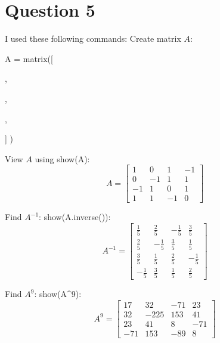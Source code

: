 \documentclass[10pt]{article}
\begin{document}
\section*{Question 5}
\noindent I used these following commands:
\noindent Create matrix $A$: \par
A = matrix([ \par
[1, 0, 1, -1], \par
[0, -1, 1, 1], \par
[-1, 1, 0, 1], \par
[1,  1, -1, 0] ] ) \par
\noindent  View $A$ using show(A):
\begin{equation*}
    A=
    \begin{bmatrix}
        1 & 0 & 1 & -1 \\
        0 & -1 & 1 & 1 \\
        -1 & 1 & 0 & 1 \\
        1 & 1 & -1 & 0
    \end{bmatrix}
\end{equation*}

\noindent Find $A^{-1}$: show(A.inverse()):
\begin{equation*}
    A^{-1}=
    \begin{bmatrix}
        \frac{1}{5} & \frac{2}{5} & -\frac{1}{5} & \frac{3}{5} \\
        \frac{2}{5} & -\frac{1}{5} & \frac{3}{5} & \frac{1}{5} \\
        \frac{3}{5} & \frac{1}{5} & \frac{2}{5} & -\frac{1}{5} \\
        -\frac{1}{5} & \frac{3}{5} & \frac{1}{5} & \frac{2}{5}
    \end{bmatrix}
\end{equation*}


\noindent Find $A^{9}$: show(A\^{}9):
\begin{equation*}
    A^{9}=
    \begin{bmatrix}
        17 & 32 & -71 & 23 \\
        32 & -225 & 153 & 41 \\
        23 & 41 & 8 & -71 \\
        -71 & 153 & -89 & 8
    \end{bmatrix}
\end{equation*}
\end{document}
